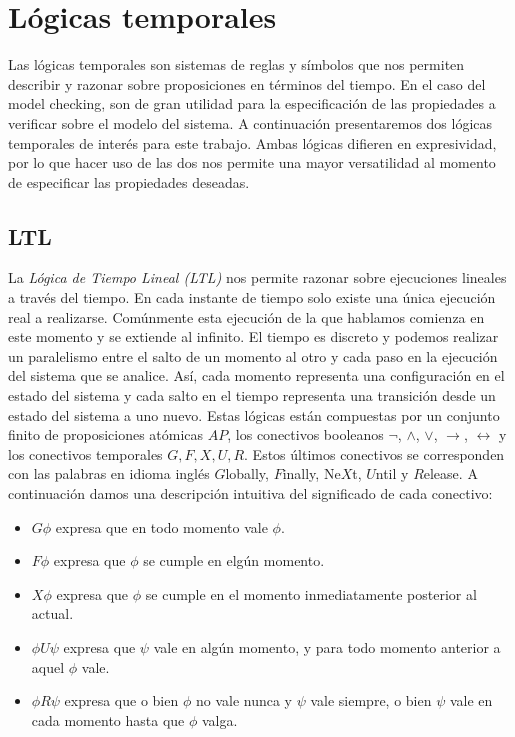 \documentclass[titlepage, 12pt]{book}
\begin{document}





\section{L\'ogicas temporales}
Las l\'ogicas temporales son sistemas de reglas y s\'imbolos que nos permiten describir y razonar sobre proposiciones en t\'erminos del tiempo. En el caso del model checking, son de gran utilidad para la especificaci\'on de las propiedades a verificar sobre el modelo del sistema. A continuaci\'on presentaremos dos l\'ogicas temporales de inter\'es para este trabajo. Ambas l\'ogicas difieren en expresividad, por lo que hacer uso de las dos nos permite una mayor versatilidad al momento de especificar las propiedades deseadas.\\

\subsection*{LTL}
La \textit{L\'ogica de Tiempo Lineal (LTL)} nos permite razonar sobre ejecuciones lineales a trav\'es del tiempo. En cada instante de tiempo solo existe una \'unica ejecuci\'on real a realizarse. Com\'unmente esta ejecuci\'on de la que hablamos comienza en este momento y se extiende al infinito. El tiempo es discreto y podemos realizar un paralelismo entre el salto de un momento al otro y cada paso en la ejecuci\'on del sistema que se analice. As\'i, cada momento representa una configuraci\'on en el estado del sistema y cada salto en el tiempo representa una transici\'on desde un estado del sistema a uno nuevo. Estas l\'ogicas est\'an compuestas por un conjunto finito de proposiciones at\'omicas $AP$, los conectivos booleanos $\neg$, $\wedge$, $\vee$, $\rightarrow$, $\leftrightarrow$ y los conectivos temporales $G, F, X, U, R$. Estos \'ultimos conectivos se corresponden con las palabras en idioma ingl\'es $G$lobally, $F$inally, Ne$X$t, $U$ntil y $R$elease. A continuaci\'on damos una descripci\'on intuitiva del significado de cada conectivo:

\begin{itemize}
\item $G \phi$ expresa que en todo momento vale $\phi$.
\item $F \phi$ expresa que $\phi$ se cumple en elg\'un momento.
\item $X \phi$ expresa que $\phi$ se cumple en el momento inmediatamente posterior al actual.
\item $\phi U \psi$ expresa que $\psi$ vale en alg\'un momento, y para todo momento anterior a aquel $\phi$ vale.
\item $\phi R \psi$ expresa que o bien $\phi$ no vale nunca y $\psi$ vale siempre, o bien $\psi$ vale en cada momento hasta que $\phi$ valga.
\end{itemize}
\end{document}
